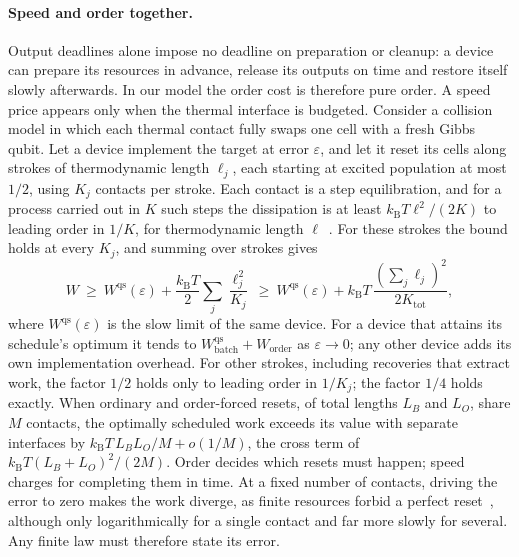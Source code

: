 \documentclass[11pt]{article}
\theoremstyle{definition}
\theoremstyle{remark}
\newcommand{\kB}{k_{\mathrm B}}
\begin{document}
\paragraph{Speed and order together.} Output deadlines alone impose no deadline on preparation or cleanup: a device can prepare its resources in advance, release its outputs on time and restore itself slowly afterwards. In our model the order cost is therefore pure order. A speed price appears only when the thermal interface is budgeted. Consider a collision model in which each thermal contact fully swaps one cell with a fresh Gibbs qubit. Let a device implement the target at error $\varepsilon$, and let it reset its cells along strokes of thermodynamic length $\ell_j$, each starting at excited population at most $1/2$, using $K_j$ contacts per stroke. Each contact is a step equilibration, and for a process carried out in $K$ such steps the dissipation is at least $\kB T\ell^2/(2K)$ to leading order in $1/K$, for thermodynamic length $\ell$~\cite{SalamonBerry83,Nulton85,Crooks07,ScandiPerarnauLlobet19,Abiuso20}. For these strokes the bound holds at every $K_j$, and summing over strokes gives
\[
W\ \ge\ W^{\mathrm{qs}}(\varepsilon)+\frac{\kB T}{2}\sum_j\frac{\ell_j^2}{K_j}\ \ge\ W^{\mathrm{qs}}(\varepsilon)+\kB T\,\frac{(\sum_j\ell_j)^2}{2K_{\mathrm{tot}}},
\]
where $W^{\mathrm{qs}}(\varepsilon)$ is the slow limit of the same device. For a device that attains its schedule's optimum it tends to $W^{\mathrm{qs}}_{\mathrm{batch}}+W_{\mathrm{order}}$ as $\varepsilon\to0$; any other device adds its own implementation overhead. For other strokes, including recoveries that extract work, the factor $1/2$ holds only to leading order in $1/K_j$; the factor $1/4$ holds exactly. When ordinary and order-forced resets, of total lengths $L_B$ and $L_O$, share $M$ contacts, the optimally scheduled work exceeds its value with separate interfaces by $\kB T\,L_BL_O/M+o(1/M)$, the cross term of $\kB T(L_B+L_O)^2/(2M)$. Order decides which resets must happen; speed charges for completing them in time. At a fixed number of contacts, driving the error to zero makes the work diverge, as finite resources forbid a perfect reset~\cite{ReebWolf14,Taranto23}, although only logarithmically for a single contact and far more slowly for several. Any finite law must therefore state its error.
\end{document}
